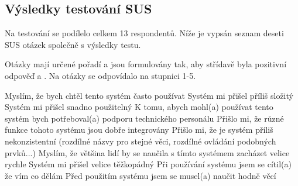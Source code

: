 \subsection{Výsledky testování SUS}

Na testování se podílelo celkem 13 respondentů. Níže je vypsán seznam deseti SUS otázek společně s výsledky testu.

Otázky mají určené pořadí a jsou formulovány tak, aby střídavě byla pozitivní odpověď  a . Na otázky se odpovídalo na stupnici 1-5.

\dataone

\expandafter\def\csname question1\endcsname{Myslím, že bych chtěl tento systém často používat}
\expandafter\def\csname question2\endcsname{Systém mi přišel příliš složitý}
\expandafter\def\csname question3\endcsname{Systém mi přišel snadno použitelný}
\expandafter\def\csname question4\endcsname{K tomu, abych mohl(a) používat tento systém bych potřeboval(a) podporu technického personálu}
\expandafter\def\csname question5\endcsname{Přišlo mi, že různé funkce tohoto systému jsou dobře integrovány}
\expandafter\def\csname question6\endcsname{Přišlo mi, že je systém příliš nekonzistentní (rozdílné názvy pro stejné věci, rozdílné ovládání podobných prvků...)}
\expandafter\def\csname question7\endcsname{Myslím, že většina lidí by se naučila s tímto systémem zacházet velice rychle}
\expandafter\def\csname question8\endcsname{Systém mi přišel velice těžkopádný}
\expandafter\def\csname question9\endcsname{Při používání systému jsem se cítil(a) že vím co dělám}
\expandafter\def\csname question10\endcsname{Před použitím systému jsem se musel(a) naučit hodně věcí}
\newcommand\question[1]{\csname question#1\endcsname}

\bigskip

